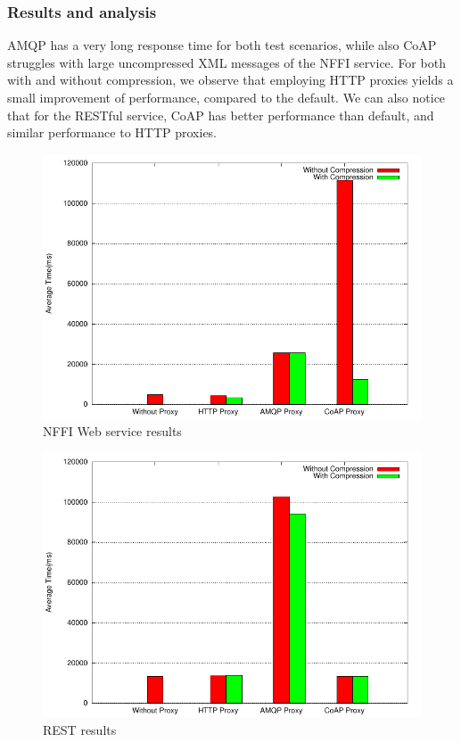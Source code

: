 \subsubsection{Results and analysis}

AMQP has a very long response time for both test scenarios, while also CoAP
struggles with large uncompressed XML messages of the NFFI service. For both
with and without compression, we observe that employing HTTP proxies yields a
small improvement of performance, compared to the default. We can also notice
that for the RESTful service, CoAP has better performance than default, and
similar performance to HTTP proxies.

\begin{figure}[H]
\center
\includegraphics[scale=0.75]{../results/satellite/nffi/result.pdf}
\caption{NFFI Web service results}
\end{figure}

\begin{figure}[H]
\center
\includegraphics[scale=0.75]{../results/satellite/rest/result.pdf}
\caption{REST results}
\end{figure}

